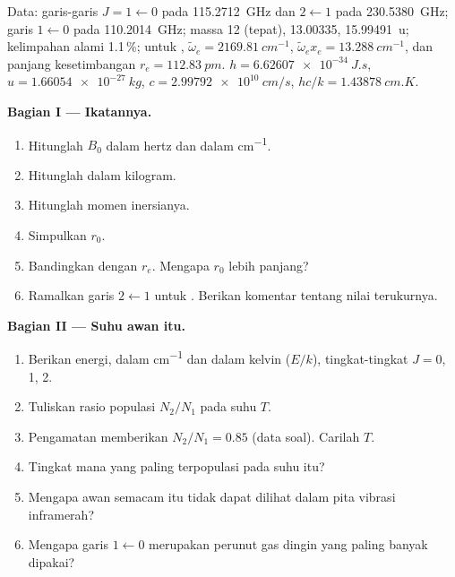 \begin{problem}
\label{pb:b3:rovibrational-spectroscopy:1}
Data: garis-garis  $J = 1 \leftarrow 0$ pada \qty{115.2712}{GHz}
dan $2
\leftarrow 1$ pada \qty{230.5380}{GHz}; garis  $1 \leftarrow 0$
pada \qty{110.2014}{GHz}; massa  12 (tepat),  13.00335,
 \qty{15.99491}{u}; kelimpahan alami  1.1\,\%; untuk
, $\tilde\omega_e = \qty{2169.81}{cm^{-1}}$,
$\tilde\omega_ex_e = \qty{13.288}{cm^{-1}}$, dan panjang kesetimbangan
$r_e = \qty{112.83}{pm}$. $h = \qty{6.62607e-34}{J.s}$, $u =
\qty{1.66054e-27}{kg}$, $c = \qty{2.99792e10}{cm/s}$, $hc/k = \qty{1.43878}{cm.K}$.

\medskip\noindent\textbf{Bagian I --- Ikatannya.}
\begin{enumerate}[beginpenalty=10000]
  \item Hitunglah $B_0$ dalam hertz dan dalam \unit{cm^{-1}}.
  \item Hitunglah   dalam kilogram.
  \item Hitunglah momen inersianya.
  \item Simpulkan $r_0$.
  \item Bandingkan dengan $r_e$. Mengapa $r_0$ lebih panjang?
  \item Ramalkan garis $2 \leftarrow 1$ untuk . Berikan komentar
        tentang nilai terukurnya.
\end{enumerate}

\medskip\noindent\textbf{Bagian II --- Suhu awan itu.}
\begin{enumerate}[resume, beginpenalty=10000]
  \item Berikan energi, dalam \unit{cm^{-1}} dan dalam kelvin ($E/k$),
        tingkat-tingkat $J =
        0$, 1, 2.
  \item Tuliskan rasio populasi $N_2/N_1$ pada suhu $T$.
  \item Pengamatan memberikan $N_2/N_1 = 0.85$ (data soal). Carilah $T$.
  \item Tingkat mana yang paling terpopulasi pada suhu itu?
  \item Mengapa awan semacam itu tidak dapat dilihat dalam pita vibrasi
        inframerah?
  \item Mengapa garis $1 \leftarrow 0$ merupakan perunut gas dingin yang
        paling banyak dipakai?
\end{enumerate}


\end{problem}

